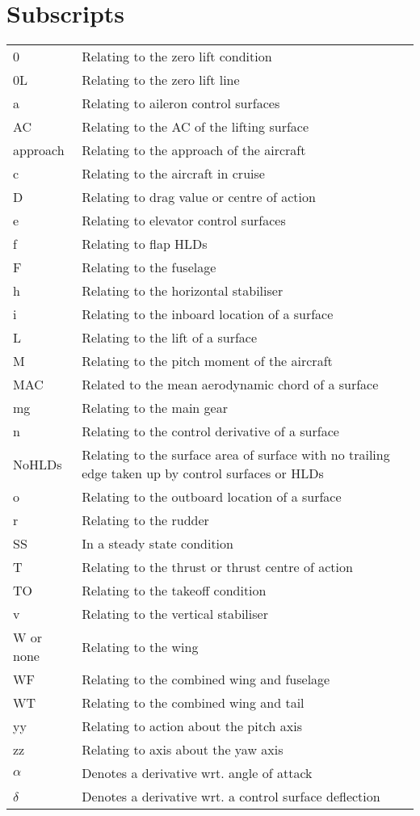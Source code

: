 \documentclass[../main.tex]{subfiles}
\newcommand{\appendixtable}[2]{
    \begin{table}[H]
        \begin{tabular}{#1}
            #2
        \end{tabular}
    \end{table}
}
\begin{document}
\section{Subscripts} \label{appendix:subscripts}

\appendixtable{l l}{
    0 & Relating to the zero lift condition \\
    0L & Relating to the zero lift line \\
    a & Relating to aileron control surfaces \\
    AC & Relating to the AC of the lifting surface \\
    approach & Relating to the approach of the aircraft \\
    c & Relating to the aircraft in cruise \\
    D & Relating to drag value or centre of action \\
    e & Relating to elevator control surfaces \\
    f & Relating to flap HLDs \\
    F & Relating to the fuselage \\
    h & Relating to the horizontal stabiliser \\
    i & Relating to the inboard location of a surface \\
    L & Relating to the lift of a surface \\
    M & Relating to the pitch moment of the aircraft \\
    MAC & Related to the mean aerodynamic chord of a surface \\
    mg & Relating to the main gear \\
    n & Relating to the control derivative of a surface \\
    NoHLDs & Relating to the surface area of surface with no trailing edge taken up by control surfaces or HLDs \\
    o & Relating to the outboard location of a surface \\
    r & Relating to the rudder \\
    SS & In a steady state condition \\
    T & Relating to the thrust or thrust centre of action \\
    TO & Relating to the takeoff condition \\
    v & Relating to the vertical stabiliser \\
    W or none & Relating to the wing \\
    WF & Relating to the combined wing and fuselage \\
    WT & Relating to the combined wing and tail \\
    yy & Relating to action about the pitch axis \\
    zz & Relating to axis about the yaw axis \\
    $\alpha$ & Denotes a derivative wrt. angle of attack \\
    $\delta$ & Denotes a derivative wrt. a control surface deflection \\
}
\end{document}
